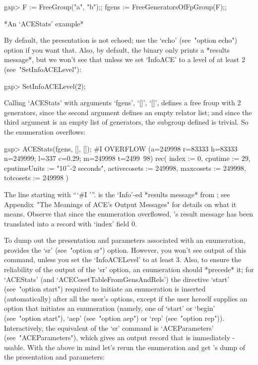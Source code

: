 \beginexample
gap> F := FreeGroup("a", "b");; fgens := FreeGeneratorsOfFpGroup(F);;
\endexample

*An `ACEStats' example*

By  default,  the  presentation  is  not  echoed;   use   the   `echo'
(see~"option echo") option if you want that.  Also,  by  default,  the
{\ACE} binary only prints a *results message*, but we won't  see  that
unless   we   set   `InfoACE'   to   a   level   of   at    least    2
(see~"SetInfoACELevel"):

\beginexample
gap> SetInfoACELevel(2);
\endexample

Calling `ACEStats' with arguments `fgens', `[]', `[]', defines a  free
froup with 2 generators, since the second argument  defines  an  empty
relator list; and since  the  third  argument  is  an  empty  list  of
generators, the  subgroup  defined  is  trivial.  So  the  enumeration
overflows:

\beginexample
gap> ACEStats(fgens, [], []);
#I  OVERFLOW (a=249998 r=83333 h=83333 n=249999; l=337 c=0.29; m=249998 t=2499\
98)
rec( index := 0, cputime := 29, cputimeUnits := "10^-2 seconds", 
  activecosets := 249998, maxcosets := 249998, totcosets := 249998 )
\endexample

The  line  starting  with   ```\#I  '''.  is  the  `Info'-ed  *results
message* from {\ACE};  see  Appendix~"The  Meanings  of  ACE's  Output
Messages" for details  on  what  it  means.  Observe  that  since  the
enumeration overflowed, {\ACE}'s result message  has  been  translated
into a {\GAP} record with `index' field 0.

To dump  out  the  presentation  and  parameters  associated  with  an
enumeration,  {\ACE}  provides  the  `sr'  (see~"option  sr")  option.
However, you won't see output of this  command,  unless  you  set  the
`InfoACELevel' to at least 3. Also, to ensure the reliability  of  the
output of the `sr' option, an enumeration  should  *precede*  it;  for
`ACEStats' (and `ACECosetTableFromGensAndRels') the directive  `start'
(see~"option start") required to initiate an enumeration  is  inserted
(automatically) after all the  user's  options,  except  if  the  user
herself supplies an option that initiates an enumeration (namely,  one
of `start' or `begin' (see~"option start"), `aep'  (see~"option  aep")
or `rep' (see~"option rep")). Interactively,  the  equivalent  of  the
`sr' command is `ACEParameters' (see~"ACEParameters"), which gives  an
output record that is immediately {\GAP}-usable.  With  the  above  in
mind let's  rerun  the  enumeration  and  get  {\ACE}'s  dump  of  the
presentation and parameters:

